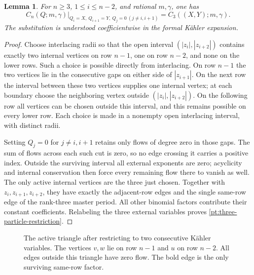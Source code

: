 \documentclass[11pt]{amsart}
\newtheorem{lemma}[theorem]{Lemma}
\theoremstyle{definition}
\theoremstyle{remark}
\numberwithin{equation}{section}
\begin{document}
\begin{lemma}\label{pt:subflag-restriction}
For $n\geq3$, $1\leq i\leq n-2$, and rational $m,\gamma$, one has
\begin{equation}\label{pt:three-particle-restriction}
 \left.C_n(Q;m,\gamma)\right|_{Q_i=X,\ Q_{i+1}=Y,\ Q_j=0\ (j\ne i,i+1)}
 =C_3((X,Y);m,\gamma).
\end{equation}
The substitution is understood coefficientwise in the formal
K\"ahler expansion.
\end{lemma}

\begin{proof}
Choose interlacing radii so that the open interval
$(|z_i|,|z_{i+2}|)$ contains exactly two internal vertices on row
$n-1$, one on row $n-2$, and none on the lower rows. Such a
choice is possible directly from interlacing. On row $n-1$ the
two vertices lie in the consecutive gaps on either side of
$|z_{i+1}|$. On the next row the interval between these two
vertices supplies one internal vertex; at each boundary choose
the neighboring vertex outside $(|z_i|,|z_{i+2}|)$. On the
following row all vertices can be chosen outside this interval,
and this remains possible on every lower row. Each choice is
made in a nonempty open interlacing interval, with distinct radii.

Setting $Q_j=0$ for $j\ne i,i+1$ retains only flows of degree
zero in those gaps. The sum of flows across each such cut is
zero, so no edge crossing it carries a positive index. Outside
the surviving interval all external exponents are zero; acyclicity
and internal conservation then force every remaining flow there
to vanish as well. The only active internal vertices are the
three just chosen. Together with $z_i,z_{i+1},z_{i+2}$, they
have exactly the adjacent-row edges and the single same-row edge
of the rank-three master period. All other binomial factors
contribute their constant coefficients. Relabeling the three
external variables proves \eqref{pt:three-particle-restriction}.
\end{proof}

\begin{figure}[t]
\centering
{}
\caption{The active triangle after restricting to two consecutive
K\"ahler variables. The vertices $v,w$ lie on row $n-1$ and $u$
on row $n-2$. All edges outside this triangle have zero flow.
The bold edge is the only surviving same-row factor.}
\label{pt:subflag-figure}
\end{figure}
\end{document}
